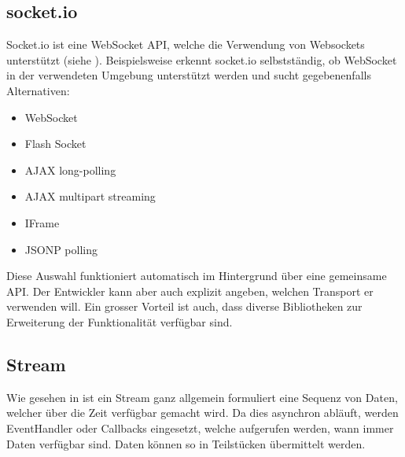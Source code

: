 

\subsection{socket.io}


Socket.io ist eine WebSocket API, welche die Verwendung von Websockets unterstützt (siehe \cite{WebSocke14:online, prusty2016modern, rai2013socket}). Beispielsweise erkennt socket.io selbstständig, ob Web\-So\-cket in der verwendeten Umgebung unterstützt werden und sucht gegebenenfalls Alternativen:

\begin{itemize}
    \item WebSocket
    \item Flash Socket
    \item AJAX long-polling
    \item AJAX multipart streaming
    \item IFrame
    \item JSONP polling
\end{itemize}

Diese Auswahl funktioniert automatisch im Hintergrund über eine gemeinsame API. Der Entwickler kann aber auch explizit angeben, welchen Transport er verwenden  will. Ein grosser Vorteil ist auch, dass diverse Bibliotheken zur Erweiterung der Funktionalität verfügbar sind.



\subsection{Stream}

Wie gesehen in \cite[S.~56]{prusty2016modern} ist ein Stream ganz allgemein formuliert eine Sequenz von Daten, welcher über die Zeit verfügbar gemacht wird. Da dies asynchron abläuft, werden EventHandler oder Callbacks eingesetzt, welche aufgerufen werden, wann immer Daten verfügbar sind. Daten können so in Teilstücken übermittelt werden.


